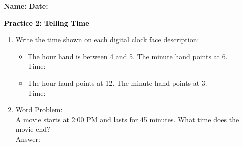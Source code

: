 \documentclass[12pt, letterpaper, fleqn]{article}
\newcommand{\blank}{\underline{\hspace{2.2cm}}}
\begin{document}
\textbf{Name:} \underline{\hspace{5cm}}
\hfill
\textbf{Date:} \underline{\hspace{3cm}}\\

\begin{tcolorbox}[colback=customteal!20]
    \large\textcolor{black}{\textbf{Practice 2: Telling Time}}
\end{tcolorbox}

\vspace{5mm}
\begin{enumerate}[itemsep=3.5cm, leftmargin=0.6cm]
\item Write the time shown on each digital clock face description:
  \begin{itemize}[itemsep=1cm]
    \item The hour hand is between 4 and 5. The minute hand points at 6. \\ Time: \blank
    \item The hour hand points at 12. The minute hand points at 3. \\ Time: \blank
  \end{itemize}

\item Word Problem:
\\
A movie starts at 2:00 PM and lasts for 45 minutes. What time does the movie end?
\\
Answer: \blank
\end{enumerate}
\end{document}
